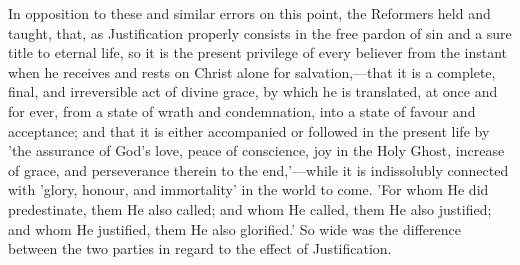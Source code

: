 \documentclass[
]{book}
\begin{document}
In opposition to these and similar errors on this point, the Reformers held and taught, that, as Justification properly consists in the free pardon of sin and a sure title to eternal life, so it is the present privilege of every believer from the instant when he receives and rests on Christ alone for salvation,---that it is a complete, final, and irreversible act of divine grace, by which he is translated, at once and for ever, from a state of wrath and condemnation, into a state of favour and acceptance; and that it is either accompanied or followed in the present life by 'the assurance of God's love, peace of conscience, joy in the Holy Ghost, increase of grace, and perseverance therein to the end,'---while it is indissolubly connected with 'glory, honour, and immortality' in the world to come. 'For whom He did predestinate, them He also called; and whom He called, them He also justified; and whom He justified, them He also glorified.' So wide was the difference between the two parties in regard to the effect of Justification.
\end{document}
